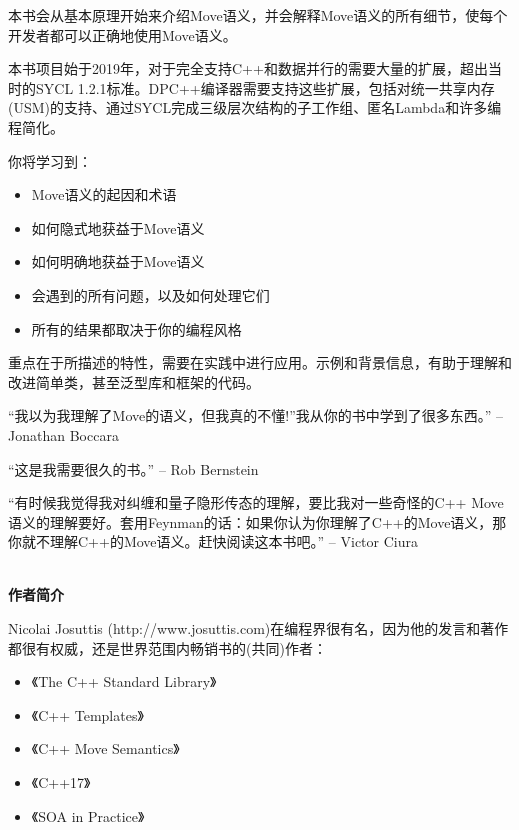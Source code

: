 \documentclass[11pt,a4paper,UTF8]{ctexart}
\begin{document}
	本书会从基本原理开始来介绍Move语义，并会解释Move语义的所有细节，使每个开发者都可以正确地使用Move语义。\par
	
	本书项目始于2019年，对于完全支持C++和数据并行的需要大量的扩展，超出当时的SYCL 1.2.1标准。DPC++编译器需要支持这些扩展，包括对统一共享内存(USM)的支持、通过SYCL完成三级层次结构的子工作组、匿名Lambda和许多编程简化。\par
	
	你将学习到：\par
	
	\begin{itemize}
		\item Move语义的起因和术语
		\item 如何隐式地获益于Move语义
		\item 如何明确地获益于Move语义
		\item 会遇到的所有问题，以及如何处理它们
		\item 所有的结果都取决于你的编程风格
	\end{itemize}
	
	重点在于所描述的特性，需要在实践中进行应用。示例和背景信息，有助于理解和改进简单类，甚至泛型库和框架的代码。\par
	
	“我以为我理解了Move的语义，但我真的不懂!”我从你的书中学到了很多东西。”	-- Jonathan Boccara\par
	
	“这是我需要很久的书。” -- Rob Bernstein\par
	
	“有时候我觉得我对纠缠和量子隐形传态的理解，要比我对一些奇怪的C++ Move语义的理解要好。套用Feynman的话：如果你认为你理解了C++的Move语义，那你就不理解C++的Move语义。赶快阅读这本书吧。”	-- Victor Ciura\par
	
	
	\hspace*{\fill} \\ %
	\noindent\textbf{作者简介}\ \par
	Nicolai Josuttis (http://www.josuttis.com)在编程界很有名，因为他的发言和著作都很有权威，还是世界范围内畅销书的(共同)作者：\par
	
	\begin{itemize}
		\item 《The C++ Standard Library》
		\item 《C++ Templates》
		\item 《C++ Move Semantics》
		\item 《C++17》
		\item 《SOA in Practice》
	\end{itemize}
	
\end{document}
